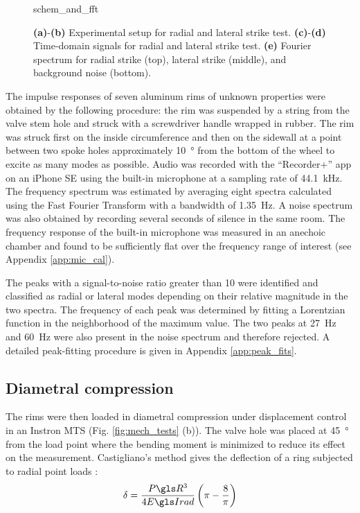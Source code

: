 \documentclass[../thesis.tex]{subfiles}
\begin{document}
\begin{figure}
\centering
{schem_and_fft}
\caption[Acoustic test on a rim]{\textbf{(a)}-\textbf{(b)} Experimental setup for radial and lateral strike test. \textbf{(c)}-\textbf{(d)} Time-domain signals for radial and lateral strike test. \textbf{(e)} Fourier spectrum for radial strike (top), lateral strike (middle), and background noise (bottom).}
\label{fig:schem}
\end{figure}

The impulse responses of seven aluminum rims of unknown properties were obtained by the following procedure: the rim was suspended by a string from the valve stem hole and struck with a screwdriver handle wrapped in rubber. The rim was struck first on the inside circumference and then on the sidewall at a point between two spoke holes approximately \SI{10}{\degree} from the bottom of the wheel to excite as many modes as possible. Audio was recorded with the ``Recorder+'' app on an iPhone SE using the built-in microphone at a sampling rate of \SI{44.1}{kHz}. The frequency spectrum was estimated by averaging eight spectra calculated using the Fast Fourier Transform with a bandwidth of \SI{1.35}{Hz}. A noise spectrum was also obtained by recording several seconds of silence in the same room. The frequency response of the built-in microphone was measured in an anechoic chamber and found to be sufficiently flat over the frequency range of interest (see Appendix \ref{app:mic_cal}).

The peaks with a signal-to-noise ratio greater than 10 were identified and classified as radial or lateral modes depending on their relative magnitude in the two spectra. The frequency of each peak was determined by fitting a Lorentzian function in the neighborhood of the maximum value. The two peaks at \SI{27}{Hz} and \SI{60}{Hz} were also present in the noise spectrum and therefore rejected. A detailed peak-fitting procedure is given in Appendix \ref{app:peak_fits}.

\subsection{Diametral compression}
The rims were then loaded in diametral compression under displacement control in an Instron MTS (Fig. \ref{fig:mech_tests} (b)). The valve hole was placed at \SI{45}{\degree} from the load point where the bending moment is minimized to reduce its effect on the measurement. Castigliano's method gives the deflection of a ring subjected to radial point loads \cite{Timoshenko1961}:
\begin{equation}\label{eq:def_rad}
\delta = \frac{P\R^3}{4\EIr} \left(\pi-\frac{8}{\pi} \right)
\end{equation}
\end{document}

